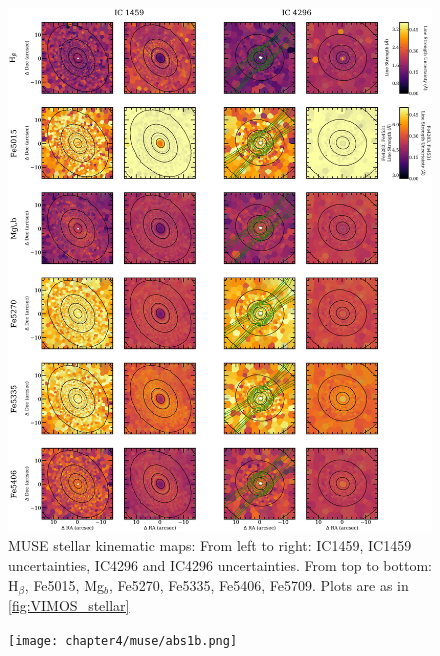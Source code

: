 {{		\begin{figure}
			\centering
			\includegraphics[height=0.94\textheight]{chapter4/muse/abs1.png}
			\caption[MUSE absorption line strength maps]{MUSE stellar kinematic maps: From left to right: IC1459, IC1459 uncertainties, IC4296 and IC4296 uncertainties. From top to bottom: H$_\beta$, Fe5015, Mg$_b$, Fe5270, Fe5335, Fe5406, Fe5709. Plots are as in \ref{fig:VIMOS_stellar}}
			\label{fig:MUSE_absorption}
		\end{figure}
		\begin{figure}
			\centering
			\texttt{[image: chapter4/muse/abs1b.png]}
		\end{figure}
		\begin{figure}
			\centering

\end{figure}}}
